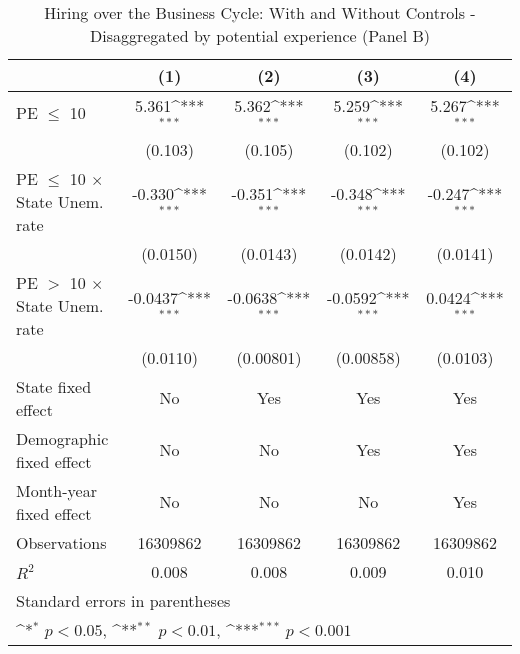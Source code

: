 \begin{table}[htbp]\centering
\def\sym#1{\ifmmode^{#1}\else\(^{#1}\)\fi}
\caption{Hiring over the Business Cycle: With and Without Controls - Disaggregated by potential experience (Panel B)}
\begin{tabular}{l*{4}{c}}
\hline\hline
                                   &\multicolumn{1}{c}{(1)}         &\multicolumn{1}{c}{(2)}         &\multicolumn{1}{c}{(3)}         &\multicolumn{1}{c}{(4)}         \\
\hline
PE $\leq$ 10                       &       5.361\sym{***}&       5.362\sym{***}&       5.259\sym{***}&       5.267\sym{***}\\
                                   &     (0.103)         &     (0.105)         &     (0.102)         &     (0.102)         \\
[1em]
PE $\leq$ 10 $\times$ State Unem. rate&      -0.330\sym{***}&      -0.351\sym{***}&      -0.348\sym{***}&      -0.247\sym{***}\\
                                   &    (0.0150)         &    (0.0143)         &    (0.0142)         &    (0.0141)         \\
[1em]
PE $>$ 10 $\times$ State Unem. rate&     -0.0437\sym{***}&     -0.0638\sym{***}&     -0.0592\sym{***}&      0.0424\sym{***}\\
                                   &    (0.0110)         &   (0.00801)         &   (0.00858)         &    (0.0103)         \\
[1em]
State fixed effect                 &          No         &         Yes         &         Yes         &         Yes         \\
[1em]
Demographic fixed effect           &          No         &          No         &         Yes         &         Yes         \\
[1em]
Month-year fixed effect            &          No         &          No         &          No         &         Yes         \\
\hline
Observations                       &    16309862         &    16309862         &    16309862         &    16309862         \\
\(R^{2}\)                          &       0.008         &       0.008         &       0.009         &       0.010         \\
\hline\hline
\multicolumn{5}{l}{\footnotesize Standard errors in parentheses}\\
\multicolumn{5}{l}{\footnotesize \sym{*} \(p<0.05\), \sym{**} \(p<0.01\), \sym{***} \(p<0.001\)}\\
\end{tabular}
\end{table}

